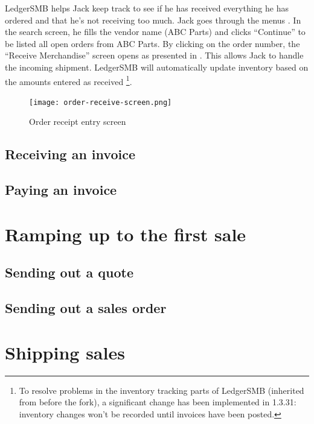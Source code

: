 LedgerSMB helps Jack keep track to see if he has received everything he has ordered and
that he's not receiving too much. Jack goes through the menus .
In the search screen, he fills the vendor name (ABC Parts) and clicks ``Continue'' to be listed
all open orders from ABC Parts. By clicking on the order number, the ``Receive Merchandise'' screen
opens as presented in . This allows Jack to handle the incoming
shipment. LedgerSMB will automatically update inventory based on the amounts entered as received
\footnote{To resolve problems in the inventory tracking parts of LedgerSMB (inherited from
before the fork), a significant change has been implemented in 1.3.31: inventory changes won't
be recorded until invoices have been posted.
}.

\begin{figure}[h]
\centering
\texttt{[image: order-receive-screen.png]}
\caption{Order receipt entry screen}
\label{fig:order-receive-screen}
\end{figure}

\section{Receiving an invoice}
\label{sec-stock-invoice}

\section{Paying an invoice}
\label{sec-stock-payment}



\chapter{Ramping up to the first sale}
\label{cha-ramping-up-to-the-first-sale}

\section{Sending out a quote} 
\label{sec-sending-a-quote}

\section{Sending out a sales order}
\label{sec-sending-a-sales-order}



\chapter{Shipping sales}
\label{cha-shipping-sales}



